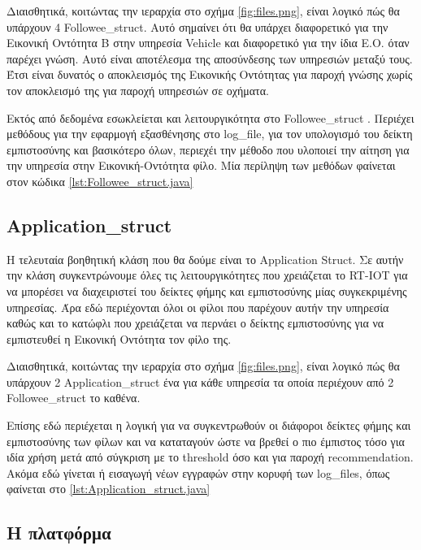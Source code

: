  Διαισθητικά, κοιτώντας την ιεραρχία στο σχήμα \ref{fig:files.png},  είναι λογικό πώς θα υπάρχουν 4 Followee\_struct. Αυτό σημαίνει 
 ότι θα υπάρχει διαφορετικό για την Εικονική Οντότητα Β στην υπηρεσία Vehicle και διαφορετικό  για την ίδια Ε.Ο. όταν παρέχει γνώση. 
 Αυτό είναι αποτέλεσμα της αποσύνδεσης των υπηρεσιών μεταξύ τους.
  Έτσι είναι δυνατός ο αποκλεισμός της Εικονικής Οντότητας για παροχή γνώσης χωρίς τον αποκλεισμό της για παροχή υπηρεσιών σε οχήματα.


Εκτός από δεδομένα εσωκλείεται και λειτουργικότητα στο Followee\_struct
. Περιέχει μεθόδους για την εφαρμογή εξασθένησης στο log\_file, για τον υπολογισμό του δείκτη εμπιστοσύνης και 
βασικότερο όλων, περιεχέι την μέθοδο που υλοποιεί την αίτηση για την υπηρεσία στην Εικονική-Οντότητα φίλο.
 Μία περίληψη των μεθόδων φαίνεται στον κώδικα \ref{lst:Followee_struct.java}



\subsection{Application\_struct}

H τελευταία βοηθητική κλάση που θα δούμε είναι το Application Struct. Σε αυτήν την κλάση συγκεντρώνουμε όλες τις λειτουργικότητες που χρειάζεται το RT-IOT για να μπορέσει να διαχειριστεί του δείκτες φήμης και εμπιστοσύνης μίας συγκεκριμένης υπηρεσίας. 
Άρα εδώ περιέχονται όλοι οι φίλοι που παρέχουν αυτήν την υπηρεσία καθώς και το κατώφλι που χρειάζεται να περνάει ο δείκτης εμπιστοσύνης για να εμπιστευθεί η Εικονική Οντότητα τον φίλο της. 

Διαισθητικά, κοιτώντας την ιεραρχία στο σχήμα \ref{fig:files.png},  είναι λογικό πώς θα υπάρχουν 2 Αpplication\_struct ένα για κάθε υπηρεσία τα οποία περιέχουν από 2 Followee\_struct το καθένα.

Επίσης εδώ περιέχεται η λογική για να συγκεντρωθούν οι διάφοροι δείκτες φήμης και εμπιστοσύνης των φίλων και να καταταγούν ώστε να βρεθεί ο πιο έμπιστος τόσο για ιδία χρήση μετά από σύγκριση με το threshold όσο και για παροχή recommendation.
 Ακόμα εδώ γίνεται ή εισαγωγή νέων εγγραφών στην κορυφή των log\_files, όπως φαίνεται στο \ref{lst:Application_struct.java}



\subsection{Η πλατφόρμα}

